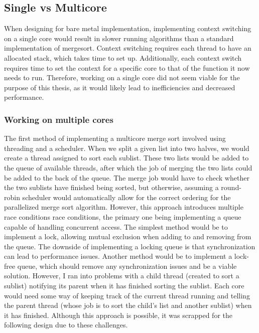 \subsection{Single vs Multicore}
 When designing for bare metal implementation, implementing context switching on
 a single core would result in slower running algorithms than a standard
 implementation of mergesort. Context switching requires each thread to have an
 allocated stack, which takes time to set up. Additionally, each context switch
 requires time to set the context for a specific core to that of the function it
 now needs to run. Therefore, working on a single core did not seem viable for
 the purpose of this thesis, as it would likely lead to inefficiencies and
 decreased performance.

\subsubsection{Working on multiple cores}
 The first method of implementing a multicore merge sort involved using
 threading and a scheduler. When we split a given list into two halves, we would
 create a thread assigned to sort each sublist. These two lists would be added
 to the queue of available threads, after which the job of merging the two lists
 could be added to the back of the queue. The merge job would have to check
 whether the two sublists have finished being sorted, but otherwise, assuming a
 round-robin scheduler would automatically allow for the correct ordering for
 the parallelized merge sort algorithm. However, this approach introduces
 multiple race conditions race conditions, the primary one being implementing a
 queue capable of handling concurrent access. The simplest method would be to
 implement a lock, allowing mutual exclusion when adding to and removing from
 the queue. The downside of implementing a locking queue is that synchronization
 can lead to performance issues. Another method would be to implement a
 lock-free queue, which should remove any synchronization issues and be a viable
 solution. However, I ran into problems with a child thread (created to sort a
 sublist) notifying its parent when it has finished sorting the sublist. Each
 core would need some way of keeping track of the current thread running and
 telling the parent thread (whose job is to sort the child's list and another
 sublist) when it has finished. Although this approach is possible, it was
 scrapped for the following design due to these challenges.

